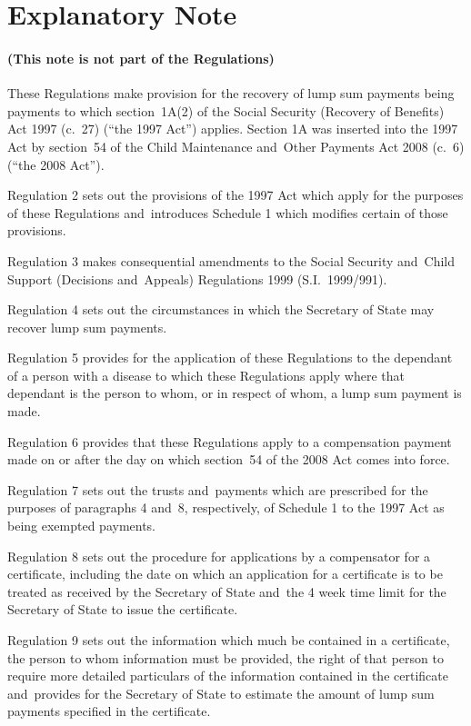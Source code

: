 \documentclass[12pt,a4paper]{article}
\begin{document}
\part{Explanatory Note}

\renewcommand\parthead{— Explanatory Note}

\subsection*{(This note is not part of the Regulations)}

These Regulations make provision for the recovery of lump sum payments being payments to which section~1A(2) of the Social Security (Recovery of Benefits) Act 1997 (c.~27) (“the 1997 Act”) applies. Section 1A was inserted into the 1997 Act by section~54 of the Child Maintenance and~Other Payments Act 2008 (c.~6) (“the 2008 Act”).

Regulation 2 sets out the provisions of the 1997 Act which apply for the purposes of these Regulations and~introduces Schedule 1 which modifies certain of those provisions.

Regulation 3 makes consequential amendments to the Social Security and~Child Support (Decisions and~Appeals) Regulations 1999 (S.I.~1999/991).

Regulation 4 sets out the circumstances in which the Secretary of State may recover lump sum payments.

Regulation 5 provides for the application of these Regulations to the dependant of a person with a disease to which these Regulations apply where that dependant is the person to whom, or in respect of whom, a lump sum payment is made.

Regulation 6 provides that these Regulations apply to a compensation payment made on or after the day on which section~54 of the 2008 Act comes into force.

Regulation 7 sets out the trusts and~payments which are prescribed for the purposes of paragraphs 4 and~8, respectively, of Schedule 1 to the 1997 Act as being exempted payments.

Regulation 8 sets out the procedure for applications by a compensator for a certificate, including the date on which an application for a certificate is to be treated as received by the Secretary of State and~the 4 week time limit for the Secretary of State to issue the certificate.

Regulation 9 sets out the information which much be contained in a certificate, the person to whom information must be provided, the right of that person to require more detailed particulars of the information contained in the certificate and~provides for the Secretary of State to estimate the amount of lump sum payments specified in the certificate.
\end{document}
